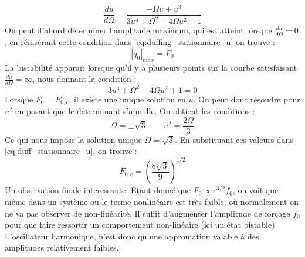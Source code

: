 %
\begin{equation}
    \frac{du}{d\Omega} = \frac{-\Omega u + u^3}{3u^4 + \Omega^2 - 4\Omega u^2 + 1}
\end{equation}
%
On peut d'abord déterminer l'amplitude maximum, qui est atteint lorsque $\frac{du}{d\Omega}=0$, en réinsérant cette condition dans \eqref{eq:duffing_stationnaire_u} on trouve :
%
\begin{equation*}
    |q_0|_{max} = F_0
\end{equation*}
%
La bistabilité apparait lorsque qu'il y a plusieurs points sur la courbe satisfaisant $\frac{du}{d\Omega}=\infty$, nous donnant la condition :
%
\begin{equation}
    3u^4 + \Omega^2 - 4\Omega u^2 + 1 = 0
\end{equation}
%
Lorsque $F_0 = F_{0,c}$, il existe une unique solution en $u$. On peut donc résoudre pour $u^2$ en posant que le déterminant s'annulle. On obtient les conditions :
%
\begin{equation}
    \Omega = \pm \sqrt{3}
    \qquad
    u^2 = \frac{2\Omega}{3}
\end{equation}
%
Ce qui nous impose la solution unique $\Omega = \sqrt{3}$. En substituant ces valeurs dans \eqref{eq:duff_stationnaire_u}, on trouve :
%
\begin{equation}
    F_{0,c} = \left(  \frac{8\sqrt{3}}{9}  \right)^{1/2}
\end{equation}
%
Un observation finale interessante. Etant donné que $F_0 \propto \epsilon^{3/2}f_0$, 
on voit que même dans un système ou le terme nonlinéaire est très faible, où normalement 
on ne va pas observer de non-linéarité. Il suffit d'augmenter l'amplitude de forçage $f_0$ 
pour que faire ressortir un comportement non-linéaire (ici un état bistable). L'oscillateur harmonique, 
n'est donc qu'une appromation valable à des amplitudes relativement faibles.
